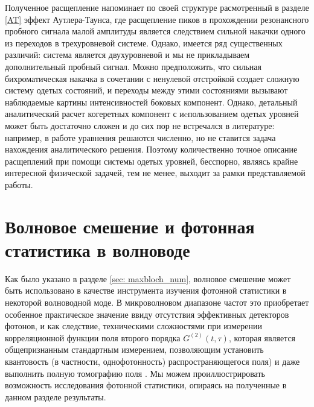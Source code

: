 Полученное расщепление напоминает по своей структуре расмотренный в разделе \ref{AT} эффект Аутлера-Таунса, где расщепление пиков в прохождении резонансного пробного сигнала малой амплитуды является следствием сильной накачки одного из переходов в трехуровневой системе. Однако, имеется ряд существенных различий: система является двухуровневой и мы не прикладываем дополнительный пробный сигнал. Можно предположить, что сильная бихроматическая накачка в сочетании с ненулевой отстройкой создает сложную систему одетых состояний, и переходы между этими состояниями вызывают наблюдаемые картины интенсивностей боковых компонент. Однако, детальный аналитический расчет когеретных компонент с иcпользованием одетых уровней может быть достаточно сложен и до сих пор не встречался в литературе: например, в работе \cite{Ficek_resonance} уравнения решаются численно, но не ставится задача нахождения аналитического решения. Поэтому количественно точное описание расщеплений при помощи системы одетых уровней, бесспорно, являясь крайне интересной физической задачей, тем не менее, выходит за рамки представляемой работы.
\section{Волновое смешение и фотонная статистика в волноводе}
\label{sec: mix_stat}
Как было указано в разделе \ref{sec: maxbloch_num}, волновое смешение может быть использовано в качестве инструмента изучения фотонной статистики в некоторой волноводной моде. В микроволновом диапазоне частот это приобретает особенное практическое значение ввиду отсутствия эффективных детекторов фотонов, и как следствие, техническими сложностями при измерении корреляционной функции поля второго порядка $G^{(2)}(t, \tau)$, которая является общепризнанным стандартным измерением, позволяющим установить квантовость (в частности, однофотонность) распространяющегося поля) и даже выполнить полную томографию поля \cite{Eichler_tomo, EichlerTomography}. Мы можем проиллюстрировать возможность исследования фотонной статистики, опираясь на полученные в данном разделе результаты.

